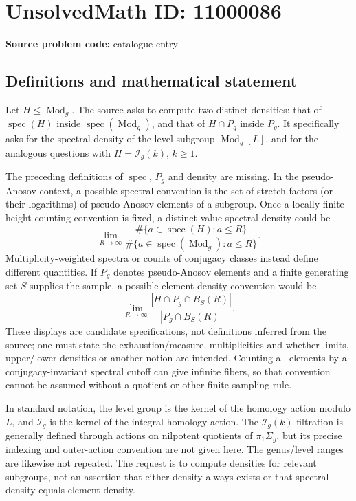\documentclass[11pt]{article}
\begin{document}
\section*{UnsolvedMath ID: 11000086}
\textbf{Source problem code:} catalogue entry
\subsection{Definitions and mathematical statement}
Let \(H\leq\operatorname{Mod}_g\). The source asks to compute two distinct densities: that of \(\operatorname{spec}(H)\) inside \(\operatorname{spec}(\operatorname{Mod}_g)\), and that of \(H\cap P_g\) inside \(P_g\). It specifically asks for the spectral density of the level subgroup \(\operatorname{Mod}_g[L]\), and for the analogous questions with \(H=\mathcal I_g(k)\), \(k\geq1\).

The preceding definitions of \(\operatorname{spec}\), \(P_g\) and density are missing. In the pseudo-Anosov context, a possible spectral convention is the set of stretch factors (or their logarithms) of pseudo-Anosov elements of a subgroup. Once a locally finite height-counting convention is fixed, a distinct-value spectral density could be
\[\lim_{R\to\infty}\frac{\#\{a\in\operatorname{spec}(H):a\leq R\}}
{\#\{a\in\operatorname{spec}(\operatorname{Mod}_g):a\leq R\}}.\]
Multiplicity-weighted spectra or counts of conjugacy classes instead define different quantities. If \(P_g\) denotes pseudo-Anosov elements and a finite generating set \(S\) supplies the sample, a possible element-density convention would be
\[\lim_{R\to\infty}\frac{|H\cap P_g\cap B_S(R)|}{|P_g\cap B_S(R)|}.\]
These displays are candidate specifications, not definitions inferred from the source; one must state the exhaustion/measure, multiplicities and whether limits, upper/lower densities or another notion are intended. Counting all elements by a conjugacy-invariant spectral cutoff can give infinite fibers, so that convention cannot be assumed without a quotient or other finite sampling rule.

In standard notation, the level group is the kernel of the homology action modulo \(L\), and \(\mathcal I_g\) is the kernel of the integral homology action. The \(\mathcal I_g(k)\) filtration is generally defined through actions on nilpotent quotients of \(\pi_1\Sigma_g\), but its precise indexing and outer-action convention are not given here. The genus/level ranges are likewise not repeated. The request is to compute densities for relevant subgroups, not an assertion that either density always exists or that spectral density equals element density.
\end{document}
